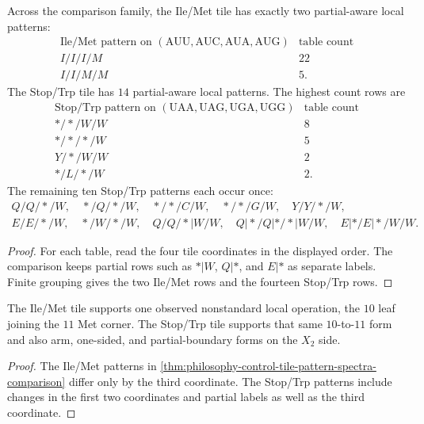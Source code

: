 \begin{theorem}
\label{thm:philosophy-control-tile-pattern-spectra-comparison}
Across the comparison family, the Ile/Met tile has exactly two
partial-aware local patterns:
$$
\begin{array}{c|r}
  \text{Ile/Met pattern on }(\mathrm{AUU},\mathrm{AUC},\mathrm{AUA},\mathrm{AUG})
    & \text{table count}\\
\hline
  I/I/I/M & 22\\
  I/I/M/M & 5.
\end{array}
$$
The Stop/Trp tile has $14$ partial-aware local patterns. The highest
count rows are
$$
\begin{array}{c|r}
  \text{Stop/Trp pattern on }(\mathrm{UAA},\mathrm{UAG},\mathrm{UGA},\mathrm{UGG})
    & \text{table count}\\
\hline
  */*/W/W & 8\\
  */*/*/W & 5\\
  Y/*/W/W & 2\\
  */L/*/W & 2.
\end{array}
$$
The remaining ten Stop/Trp patterns each occur once:
$$
\begin{gathered}
  Q/Q/*/W,\quad */Q/*/W,\quad */*/C/W,\quad */*/G/W,\quad
  Y/Y/*/W,\\
  E/E/*/W,\quad */W/*/W,\quad Q/Q/*|W/W,\quad
  Q|*/Q|*/*|W/W,\quad E|*/E|*/W/W.
\end{gathered}
$$
\end{theorem}
\begin{proof}
For each table, read the four tile coordinates in the displayed order.
The comparison keeps partial rows such as $*|W$, $Q|*$, and $E|*$ as
separate labels. Finite grouping gives the two Ile/Met rows and the
fourteen Stop/Trp rows.
\end{proof}

\begin{corollary}
\label{cor:philosophy-stop-trp-richer-comparative-tile-dynamics}
The Ile/Met tile supports one observed nonstandard local operation,
the $10$ leaf joining the $11$ Met corner. The Stop/Trp tile supports
that same $10$-to-$11$ form and also arm, one-sided, and partial-boundary
forms on the $X_{2}$ side.
\end{corollary}
\begin{proof}
The Ile/Met patterns in
\autoref{thm:philosophy-control-tile-pattern-spectra-comparison} differ
only by the third coordinate. The Stop/Trp patterns include changes in
the first two coordinates and partial labels as well as the third
coordinate.
\end{proof}

